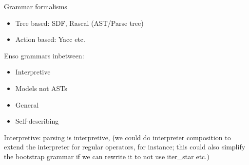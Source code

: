 
Grammar formalisms
\begin{itemize}
\item Tree based: SDF, Rascal (AST/Parse tree)
\item Action based: Yacc etc.
\end{itemize}

Enso grammars inbetween:


\begin{itemize}
\item Interpretive
\item Models not ASTs
\item General
\item Self-describing
\end{itemize}



Interpretive: parsing is interpretive, (we could do interpreter
composition to extend the interpreter for regular operators, for
instance; this could also simplify the bootstrap grammar if we can
rewrite it to not use iter\_star etc.)


